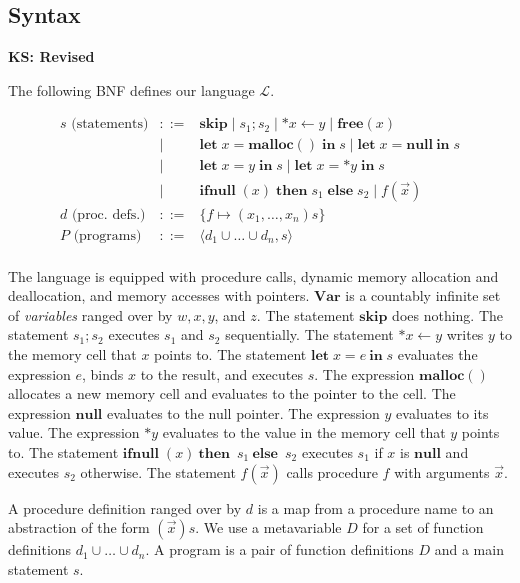 \documentclass[english]{jssst_ppl} %
\newcommand\LET{\mathbf{let}\;}
\newcommand\IN{\mathbf{in}\;}
\newcommand\SKIP{\mathbf{skip}}
\newcommand\NULL{\mathbf{null}}
\newcommand\IFNULL{\mathbf{ifnull}\;}
\newcommand\THEN{\mathbf{then}\;}
\newcommand\ELSE{\mathbf{else}\;}
\newcommand\MALLOC{\mathbf{malloc()}\;}
\newcommand\Malloc{\mathbf{malloc}}
\newcommand\Free{\mathbf{free}}
\newcommand\set[1]{\{#1\}}
\theoremstyle{definition}
\newcommand\todo[1]{{\bf KS: {#1}}}
\begin{document}
\subsection{Syntax}
\label{sec:languageSyntax}

\todo{Revised}

The following BNF defines our language \(\mathcal{L}\).

\begin{eqnarray*}
  s \mbox{ (statements)} & ::= &  \SKIP \mid s_{1};s_{2} \mid *x \leftarrow y \mid \Free(x) \\
  & \mid & \LET x = \MALLOC \IN s \mid \LET x = \NULL\ \IN s  \\
  & \mid & \LET x = y \; \IN s \mid   \LET x = *y \; \IN s \\
  & \mid & \IFNULL(x) \; \THEN s_{1}\; \ELSE s_{2} \mid f(\vec{x})\\
  d \mbox{ (proc. defs.)} & ::= & \set{f \mapsto (x_1,\dots,x_n)s}\\
  P \mbox{ (programs)} &::=& \langle d_1 \cup \dots \cup d_n, s \rangle\\
\end{eqnarray*}

The language is equipped with procedure calls, dynamic memory
allocation and deallocation, and memory accesses with pointers.
\(\mathbf{Var}\) is a countably infinite set of \emph{variables}
ranged over by \(w, x, y\), and \(z\).  The statement \(\SKIP\) does
nothing.  The statement \(s_1;s_2\) executes \(s_1\) and \(s_2\)
sequentially.  The statement \(*x \leftarrow y\) writes \(y\) to the
memory cell that \(x\) points to.  The statement \(\LET x = e\ \IN s\)
evaluates the expression \(e\), binds \(x\) to the result, and
executes \(s\).  The expression \(\Malloc()\) allocates a new memory
cell and evaluates to the pointer to the cell.  The expression
\(\NULL\) evaluates to the null pointer.  The expression \(y\)
evaluates to its value.  The expression \(*y\) evaluates to the value
in the memory cell that \(y\) points to.  The statement
\(\IFNULL(x)\ \THEN\ s_1\ \ELSE\ s_2\) executes \(s_1\) if \(x\) is
\(\NULL\) and executes \(s_2\) otherwise.  The statement
\(f(\vec{x})\) calls procedure \(f\) with arguments \(\vec{x}\).

A procedure definition ranged over by \(d\) is a map from a procedure
name to an abstraction of the form \((\vec{x})s\).  We use a
metavariable \(D\) for a set of function definitions \(d_1 \cup \dots
\cup d_n\).  A program is a pair of function definitions \(D\) and a
main statement \(s\).
\end{document}
